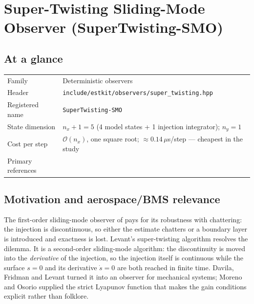 \chapter{Super-Twisting Sliding-Mode Observer (SuperTwisting-SMO)}
\label{ch:supertwistingsmo}

\section*{At a glance}
\begin{tabular}{@{}l>{\raggedright\arraybackslash}p{}@{}}
Family & Deterministic observers \\
Header & \texttt{include/estkit/observers/super\_twisting.hpp} \\
Registered name & \texttt{SuperTwisting-SMO} \\
State dimension & $n_x + 1 = 5$ (4 model states + 1 injection integrator); $n_y = 1$ \\
Cost per step & $\mathcal{O}(n_x)$, one square root; $\approx 0.14\,\mu$s/step --- cheapest in the study \\
Primary references & \cite{levant1993,davila2005,moreno2008,moreno2012strict,utkin1992} \\
\end{tabular}

\section{Motivation and aerospace/BMS relevance}
The first-order sliding-mode observer of  pays for its robustness with chattering:
the injection is discontinuous, so either the estimate chatters or a boundary layer is introduced
and exactness is lost.  Levant's super-twisting algorithm \cite{levant1993} resolves the dilemma.
It is a second-order sliding-mode algorithm: the discontinuity is moved into the \emph{derivative}
of the injection, so the injection itself is continuous while the surface $s=0$ and its derivative
$\dot{s}=0$ are both reached in finite time.  Davila, Fridman and Levant \cite{davila2005} turned
it into an observer for mechanical systems; Moreno and Osorio
\cite{moreno2008,moreno2012strict} supplied the strict Lyapunov function that makes the gain
conditions explicit rather than folklore.

